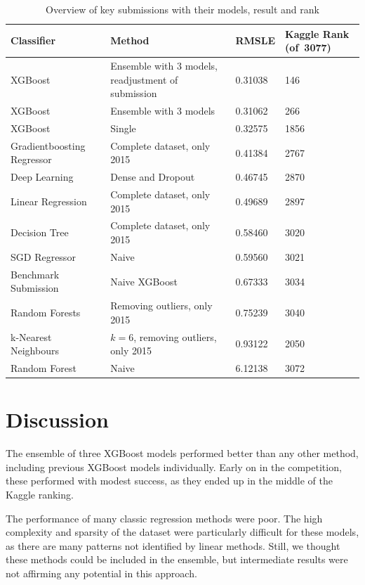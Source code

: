 \documentclass[a4paper,11pt,twocolumn]{article}
\begin{document}
\begin{table}[ht]
    \centering
    \begin{tabular}{| p{} | p{} | p{} |
    p{}|}
    \hline
    \textbf{Classifier} & \textbf{Method} & \textbf{RMSLE} & \textbf{Kaggle Rank
    (of~3077)} \\
    \hline
    XGBoost & Ensemble with 3 models, readjustment of submission & 0.31038 & 146 \\
    \hline
    XGBoost & Ensemble with 3 models & 0.31062 & 266 \\
    \hline
    XGBoost & Single & 0.32575 & 1856 \\
    \hline
    Gradientboosting Regressor & Complete dataset, only 2015 & 0.41384 & 2767 \\
    \hline
    Deep Learning & Dense and Dropout & 0.46745 & 2870 \\
    \hline
    Linear Regression & Complete dataset, only 2015 & 0.49689 & 2897 \\
    \hline
    Decision Tree & Complete dataset, only 2015 & 0.58460 & 3020 \\
    \hline
    SGD Regressor & Naive & 0.59560 & 3021 \\
    \hline
    Benchmark Submission & Naive XGBoost & 0.67333 & 3034 \\
    \hline
    Random Forests & Removing outliers, only 2015 & 0.75239 & 3040 \\
    \hline
    k-Nearest Neighbours & $k = 6$, removing outliers, only 2015 & 0.93122 &
    2050 \\
    \hline
    Random Forest & Naive & 6.12138 & 3072 \\
    \hline
    \end{tabular}
\caption{Overview of key submissions with their models, result and rank}
\label{tbl:xval}
\end{table}

\section{Discussion}
The ensemble of three XGBoost models performed better than any other method,
including previous XGBoost models individually. Early on in the competition,
these performed with modest success, as they ended up in the middle of the
Kaggle ranking.

The performance of many classic regression methods were poor. The high
complexity and sparsity of the dataset were particularly difficult for these
models, as there are many patterns not identified by linear methods. Still, we
thought these methods could be included in the ensemble, but intermediate
results were not affirming any potential in this approach.
\end{document}
